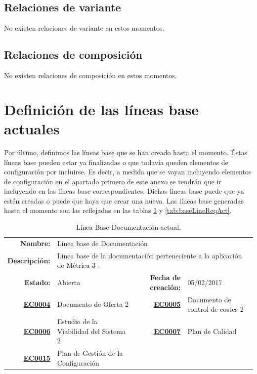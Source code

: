 \subsection{Relaciones de variante}
No existen relaciones de variante en estos momentos.

\subsection{Relaciones de composición}
No existen relaciones de composición en estos momentos.




\section{Definición de las líneas base actuales}
\par Por último, definimos las líneas base que se han creado hasta el momento. Éstas líneas base pueden estar ya finalizadas o que todavía queden elementos de configuración por
incluirse. Es decir, a medida que se vayan incluyendo elementos de configuración en el apartado primero de este anexo se tendrán que ir incluyendo en las líneas base correspondientes. Dichas líneas base puede que ya estén creadas o puede que haya que crear
una nueva. Las líneas base generadas hasta el momento son las reflejadas en las tablas \ref{tab:baseLineDocAct} y \ref{tab:baseLineReqAct}.

\begin{table}[h]
\begin{center}
\begin{tabular}{ r l | r l }
\hline
\textbf{Nombre:} & \multicolumn{3}{p{10cm}}{Linea base de Documentación} \\
\textbf{Descripción:} & \multicolumn{3}{p{10cm}}{Línea base de la documentación perteneciente a la aplicación de Métrica 3 \cite{WEB:Metrica3}.} \\ \hline \hline
\textbf{Estado:} & Abierta & \textbf{Fecha de creación:} & 05/02/2017 \\ \hline
\textbf{\hyperref[EC:0004]{EC0004}} & Documento de Oferta 2 & \textbf{\hyperref[EC:0005]{EC0005}} & Documento de control de costes 2 \\
\textbf{\hyperref[EC:0006]{EC0006}} & Estudio de la Viabilidad del Sistema 2 & \textbf{\hyperref[EC:0007]{EC0007}} & Plan de Calidad \\
\textbf{\hyperref[EC:0015]{EC0015}} & Plan de Gestión de la Configuración & \\
\hline
\end{tabular}
\caption{Línea Base Documentación actual.}
\label{tab:baseLineDocAct}
\end{center}
\end{table}




